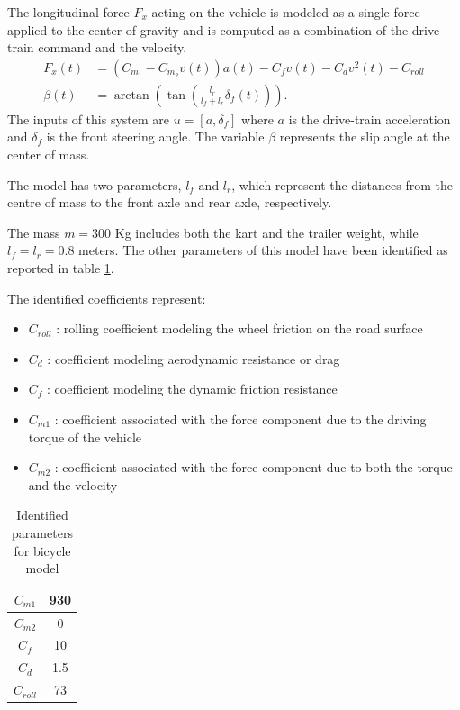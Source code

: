 \documentclass[a4paper,12pt,oneside]{book}
\begin{document}
The longitudinal force $F_x$ acting on the vehicle is modeled as a single force applied to the center of gravity and is computed as a combination of the drive-train command and the velocity. 
\begin{align}
    F_x (t) &= (C_{m_1} - C_{m_2} v(t)) a(t) - C_f v(t) - C_d v^2(t) - C_{roll} \label{eq:Long_force}\\
    \beta(t) &= \arctan\left(\tan\left(\frac{l_r}{l_f+l_r}\delta_f(t)\right) \right).
\end{align}
The inputs of this system are $u = [a, \delta_f]$ where $a$ is the drive-train acceleration and $\delta_f$ is the front steering angle. 
The variable $\beta$ represents the slip angle at the center of mass. 

\bigskip
The model has two parameters, $l_f$ and $l_r$, which represent the distances from the centre of mass to the front axle and rear axle, respectively.

The mass $m = 300$ Kg includes both the kart and the trailer weight, while $l_f = l_r = 0.8$ meters.
The other parameters of this model have been identified as reported in table \ref{tab:Parameters}.


\bigskip
The identified coefficients represent:
\begin{itemize}
    \item $C_{roll}$ : rolling coefficient modeling the wheel friction on the road surface
    \item $C_d$ : coefficient modeling aerodynamic resistance or drag
    \item $C_f$ : coefficient modeling the dynamic friction resistance
    \item $C_{m1}$ : coefficient associated with the force component due to the driving torque of the vehicle
    \item $C_{m2}$ : coefficient associated with the force component due to both the torque and the velocity
\end{itemize}

\begin{table}[h!]
    \centering
    \begin{tabular}{|c|c|}
        \hline
        $C_{m1}$ & 930 \\
        \hline
        $C_{m2}$ & 0 \\
        \hline
        $C_f$ & 10 \\
        \hline
        $C_d$ & 1.5 \\
        \hline
        $C_{roll}$ & 73 \\
        \hline
    \end{tabular}
    \caption{Identified parameters for bicycle model}
    \label{tab:Parameters}
\end{table}
\end{document}
